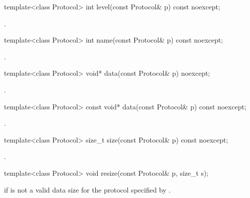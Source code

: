 \begin{itemdecl}
template<class Protocol> int level(const Protocol& p) const noexcept;
\end{itemdecl}

\begin{itemdescr}
\pnum
\returns {}.
\end{itemdescr}

\begin{itemdecl}
template<class Protocol> int name(const Protocol& p) const noexcept;
\end{itemdecl}

\begin{itemdescr}
\pnum
\returns {}.
\end{itemdescr}

\begin{itemdecl}
template<class Protocol> void* data(const Protocol& p) noexcept;
\end{itemdecl}

\begin{itemdescr}
\pnum
\returns {}.
\end{itemdescr}

\begin{itemdecl}
template<class Protocol> const void* data(const Protocol& p) const noexcept;
\end{itemdecl}

\begin{itemdescr}
\pnum
\returns {}.
\end{itemdescr}

\begin{itemdecl}
template<class Protocol> size_t size(const Protocol& p) const noexcept;
\end{itemdecl}

\begin{itemdescr}
\pnum
\returns {}.
\end{itemdescr}

\begin{itemdecl}
template<class Protocol> void resize(const Protocol& p, size_t s);
\end{itemdecl}

\begin{itemdescr}
\pnum
\remarks {} if  is not a valid data size for the protocol specified by .
\end{itemdescr}




